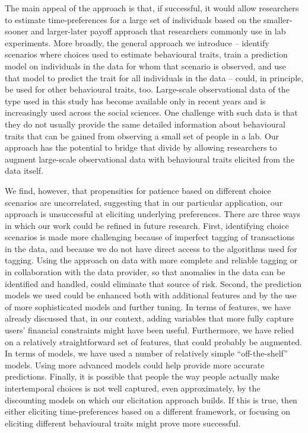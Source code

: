 The main appeal of the approach is that, if successful, it would allow
researchers to estimate time-preferences for a large set of individuals based
on the smaller-sooner and larger-later payoff approach that researchers
commonly use in lab experiments. More broadly, the general approach we
introduce -- identify scenarios where choices used to estimate behavioural
traits, train a prediction model on individuals in the data for whom that
scenario is observed, and use that model to predict the trait for all
individuals in the data -- could, in principle, be used for other behavioural
traits, too. Large-scale observational data of the type used in this study has
become available only in recent years and is increasingly used across the
social sciences. One challenge with such data is that they do not usually
provide the same detailed information about behavioural traits that can be gained
from observing a small set of people in a lab. Our approach has the potential
to bridge that divide by allowing researchers to augment large-scale
observational data with behavioural traits elicited from the data itself.

We find, however, that propensities for patience based on different choice
scenarios are uncorrelated, suggesting that in our particular application, our
approach is unsuccessful at eliciting underlying preferences. There are three
ways in which our work could be refined in future research. First, identifying
choice scenarios is made more challenging because of imperfect tagging of
transactions in the data, and because we do not have direct access to the
algorithms used for tagging. Using the approach on data with more complete and
reliable tagging or in collaboration with the data provider, so that anomalies
in the data can be identified and handled, could eliminate that source of risk.
Second, the prediction models we used could be enhanced both with additional
features and by the use of more sophisticated models and further tuning. In
terms of features, we have already discussed that, in our context, adding
variables that more fully capture users' financial constraints might have been
useful. Furthermore, we have relied on a relatively straightforward set of
features, that could probably be augmented. In terms of models, we have used a
number of relatively simple ``off-the-shelf'' models. Using more advanced
models could help provide more accurate predictions. Finally, it is possible
that people the way people actually make intertemporal choices is not well
captured, even approximately, by the discounting models on which our
elicitation approach builds. If this is true, then either eliciting
time-preferences based on a different framework, or focusing on eliciting
different behavioural traits might prove more successful.

